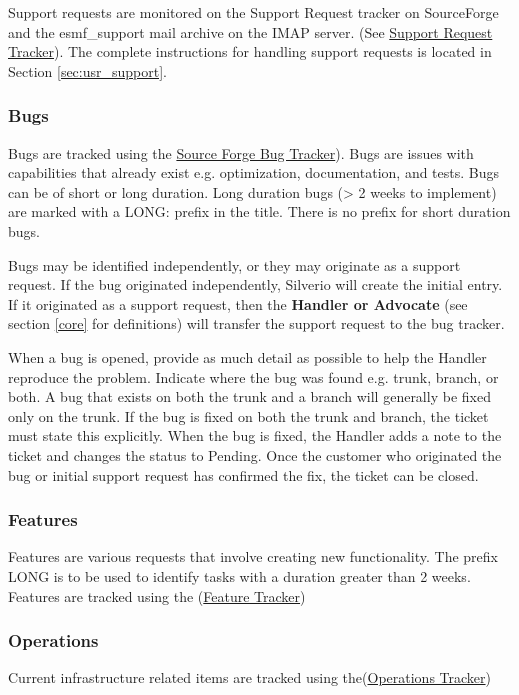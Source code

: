 Support requests are monitored on the Support Request tracker on SourceForge and the esmf\_support mail archive on the IMAP server. (See \href{http://sourceforge.net/tracker/?group_id=38089\&atid=421186}{Support Request Tracker}). The complete instructions for handling support requests is located in Section \autoref{sec:usr_support}.

\subsubsection{Bugs}

Bugs are tracked using the \href{http://sourceforge.net/tracker/?group_id=38089\&atid=421185}{Source Forge Bug Tracker}). Bugs are issues with capabilities that already exist e.g. optimization, documentation, and tests. Bugs can be of short or long duration.  Long duration bugs (> 2 weeks to implement) are marked with a LONG: prefix in the title.  There is no prefix for short duration bugs.

Bugs may be identified independently, or they may originate as a support request. If the bug originated independently, Silverio will create the initial entry. If it originated as a support request, then the {\bf Handler or Advocate} (see section \autoref{core} for definitions) will transfer the support request to the bug tracker. 

When a bug is opened, provide as much detail as possible to help the Handler reproduce the problem. Indicate where the bug was found e.g. trunk, branch, or both. A bug that exists on both the trunk and a branch will generally be fixed only on the trunk. If the bug is fixed on both the trunk and branch, the ticket must  state this explicitly. When the bug is fixed, the Handler adds a note to the ticket and changes the status to Pending. Once the customer who originated the bug or initial support request has confirmed the fix, the ticket can be closed. 

\subsubsection{Features}

Features are various requests that involve creating new functionality. The prefix LONG is to be used to identify tasks with a duration greater than 2 weeks. Features are tracked using the 
(\href{http://sourceforge.net/tracker/?group_id=38089\&atid=421188}{Feature Tracker})

\subsubsection{Operations}
Current infrastructure related items are tracked using the(\href{http://sourceforge.net/tracker/?group_id=38089\&atid=421187}{Operations Tracker})

